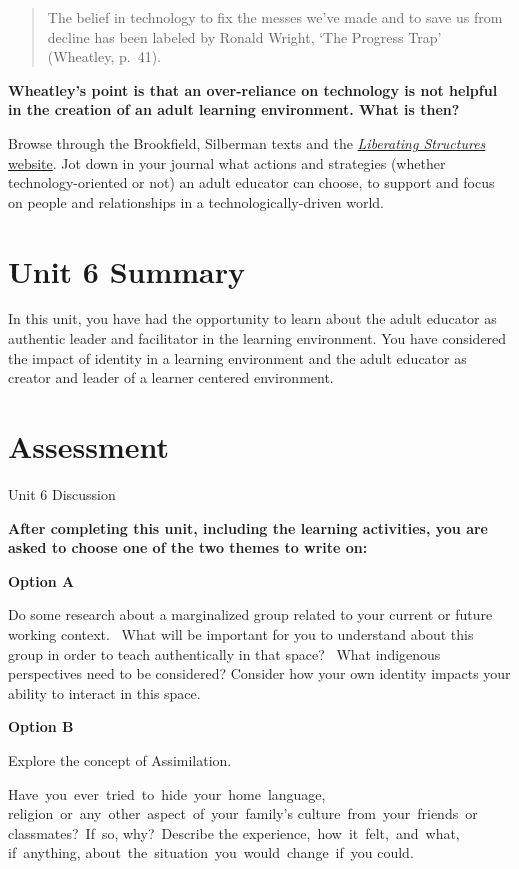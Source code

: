 \documentclass[
]{book}
\begin{document}
\begin{reflect}
\begin{quote}
The belief in technology to fix the messes we've made and to save us
from decline has been labeled by Ronald Wright, `The Progress Trap'
(Wheatley, p.~41).
\end{quote}

\textbf{Wheatley's point is that an over-reliance on technology is not
helpful in the creation of an adult learning environment. What is then?}

Browse through the Brookfield, Silberman texts and the
\href{http://www.liberatingstructures.com/ls-menu/}{\emph{Liberating
Structures} website}. Jot down in your journal what actions and
strategies (whether technology-oriented or not) an adult educator can
choose, to support and focus on people and relationships in a
technologically-driven world.
\end{reflect}

\hypertarget{unit-6-summary}{%
\section*{Unit 6 Summary}\label{unit-6-summary}}

In this unit, you have had the opportunity to learn about the adult educator as authentic leader and facilitator in the learning environment. You have considered the impact of identity in a learning environment and the adult educator as creator and leader of a learner centered environment.

\hypertarget{assessment-5}{%
\section*{Assessment}\label{assessment-5}}

\begin{assessment}
{Unit 6 Discussion}

\textbf{After completing this unit, including the learning activities,
you are asked to choose one of the two themes to write on:}

\textbf{Option A}

Do some research about a marginalized group related to your current or
future working context. ~What will be important for you to understand
about this group in order to teach authentically in that space? ~What
indigenous perspectives need to be considered? Consider how your own
identity impacts your ability to interact in this space. ~

\textbf{Option B}

Explore the concept of Assimilation.

Have~you~ever~tried~to~hide~your~home~language,
religion~or~any~other~aspect~of~your~family's
culture~from~your~friends~or classmates?~If~so, why?~Describe the
experience,~how~it~felt,~and~what, if~anything,
about~the~situation~you~would~change~if~you could.
\end{assessment}
\end{document}

